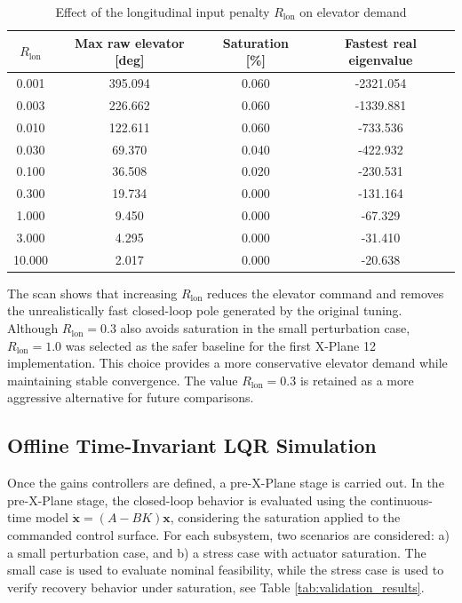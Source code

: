 \documentclass[10pt]{article}
\begin{document}
\begin{table}[h!]
\centering
\caption{Effect of the longitudinal input penalty $R_{\mathrm{lon}}$ on elevator demand}
\label{tab1:rscan}
\begin{tabular}{c c c c}
\hline
$R_{\mathrm{lon}}$ & Max raw elevator [deg] & Saturation [\%] & Fastest real eigenvalue \\
\hline
0.001 & 395.094 & 0.060 & -2321.054 \\
0.003 & 226.662 & 0.060 & -1339.881 \\
0.010 & 122.611 & 0.060 & -733.536 \\
0.030 & 69.370  & 0.040 & -422.932 \\
0.100 & 36.508  & 0.020 & -230.531 \\
0.300 & 19.734  & 0.000 & -131.164 \\
1.000 & 9.450   & 0.000 & -67.329 \\
3.000 & 4.295   & 0.000 & -31.410 \\
10.000 & 2.017  & 0.000 & -20.638 \\
\hline
\end{tabular}
\end{table}

The scan shows that increasing $R_{\mathrm{lon}}$ reduces the elevator
command and removes the unrealistically fast closed-loop pole generated
by the original tuning. Although $R_{\mathrm{lon}}=0.3$ also avoids
saturation in the small perturbation case, $R_{\mathrm{lon}}=1.0$ was
selected as the safer baseline for the first X-Plane 12 implementation.
This choice provides a more conservative elevator demand while
maintaining stable convergence. The value $R_{\mathrm{lon}}=0.3$ is
retained as a more aggressive alternative for future comparisons.


\subsection{Offline Time-Invariant LQR Simulation}

Once the gains controllers are defined, a pre-X-Plane stage is carried out.
%
In the pre-X-Plane stage, the closed-loop behavior is evaluated using the continuous-time model $\dot{\bm{x}}=(A-BK)\bm{x}$, considering the saturation applied to the commanded control surface. 
%
For each subsystem, two scenarios are considered: a) a small perturbation case, and b) a stress case with actuator saturation. 
%
The small case is used to evaluate nominal feasibility, while the stress case is used to verify recovery behavior under saturation, see Table \ref{tab:validation_results}.
\end{document}
